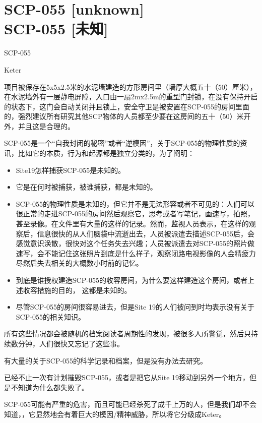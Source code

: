 \chapter[SCP-055 {[}未知{]}]{
    SCP-055 [unknown]\\
    SCP-055 [未知]\\
    \heritage
}

SCP-055

Keter

项目被保存在5x5x2.5米的水泥墙建造的方形房间里（墙厚大概五十（50）厘米），在水泥墙外有一层静电屏障，入口由一扇2mx2.5m的重型门封锁，在没有保持开启的状态下，这门会自动关闭并且锁上，安全守卫是被安置在SCP-055的房间里面的，强烈建议所有研究其他SCP物体的人员都至少要在这房间的五十（50）米开外，并且这是合理的。

SCP-055是一个“自我封闭的秘密”或者“逆模因”，关于SCP-055的物理性质的资讯，比如它的本质，行为和起源都是独立分类的，为了阐明：

\begin{itemize}
\item Site19怎样捕获SCP-055是未知的。
\item 它是在何时被捕获，被谁捕获，都是未知的。
\item SCP-055的物理性质是未知的，但它并不是无法形容或者不可见的：人们可以很正常的走进SCP-055的房间然后观察它，思考或者写笔记，画速写，拍照，甚至录像。在文件里有大量的这样的记录。然而，监视人员表示，在这样的观察后，信息很快的从人们脑袋中流逝出去，人员被派遣去描述SCP-055后，会感觉意识涣散，很快对这个任务失去兴趣；人员被派遣去对SCP-055的照片做速写，会不能记住这张照片到底是什么样子，观察闭路电视影像的人会精疲力尽然后失去相关的大概数小时前的记忆。
\item 到底是谁授权建造SCP-055的收容房间，为什么要这样建造这个房间，或者上述收容措施的目的， 这都是未知的。
\item 尽管SCP-055的房间很容易进去，但是Site 19的人们被问到时均表示没有关于SCP-055的相关知识。
\end{itemize}

所有这些情况都会被随机的档案阅读者周期性的发现，被很多人所警觉，然后只持续数分钟，人们很快又忘记了这些事。

有大量的关于SCP-055的科学记录和档案，但是没有办法去研究。

已经不止一次有计划摧毁SCP-055，或者是把它从Site 19移动到另外一个地方，但是不知道为什么都失败了。

SCP-055可能有严重的危害，而且可能已经杀死了成千上万的人，但是我们却不会知道，，它显然地会有着巨大的模因\slash 精神威胁，所以将它分级成Keter。

